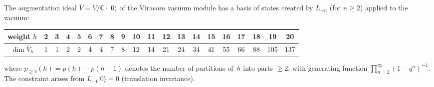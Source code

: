 \begin{computation}\label{comp:virasoro-vacuum}
The augmentation ideal $\bar{V} = V/\mathbb{C}\cdot|0\rangle$ of the Virasoro vacuum module has a basis of states created by $L_{-n}$ (for $n \geq 2$) applied to the vacuum:
\begin{center}
{\small
\begin{tabular}{c|ccccccccccccccccccc}
weight $h$ & 2 & 3 & 4 & 5 & 6 & 7 & 8 & 9 & 10 & 11 & 12 & 13 & 14 & 15 & 16 & 17 & 18 & 19 & 20 \\
\hline
$\dim \bar{V}_h$ & 1 & 1 & 2 & 2 & 4 & 4 & 7 & 8 & 12 & 14 & 21 & 24 & 34 & 41 & 55 & 66 & 88 & 105 & 137
\end{tabular}
}
\end{center}
where $p_{\geq 2}(h) = p(h) - p(h-1)$ denotes the number of partitions of~$h$ into parts $\geq 2$, with generating function $\prod_{n=2}^{\infty}(1-q^n)^{-1}$. The constraint arises from $L_{-1}|0\rangle = 0$ (translation invariance).
\end{computation}

